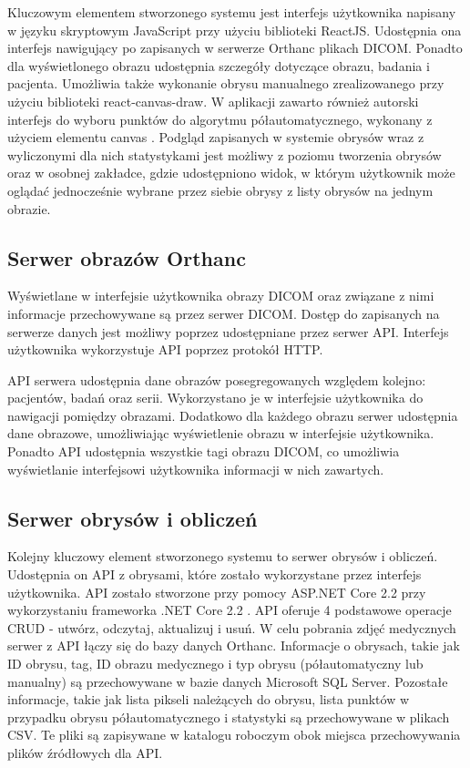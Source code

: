 \documentclass[a4paper,11pt,twoside,openright]{report}
\theoremstyle{definition}
\begin{document}
Kluczowym elementem stworzonego systemu jest interfejs użytkownika napisany w
języku skryptowym JavaScript przy użyciu biblioteki ReactJS. Udostępnia ona
interfejs nawigujący po zapisanych w serwerze Orthanc plikach DICOM. Ponadto dla
wyświetlonego obrazu udostępnia szczegóły dotyczące obrazu, badania i pacjenta.
Umożliwia także wykonanie obrysu manualnego zrealizowanego przy użyciu biblioteki
react-canvas-draw. W aplikacji zawarto również autorski interfejs do wyboru punktów
do algorytmu półautomatycznego, wykonany z użyciem elementu canvas \cite{Canvas}.
Podgląd zapisanych w systemie obrysów wraz z wyliczonymi dla nich statystykami
jest możliwy z poziomu tworzenia obrysów oraz w osobnej zakładce, gdzie udostępniono
widok, w którym użytkownik może oglądać jednocześnie wybrane przez siebie obrysy
z listy obrysów na jednym obrazie.

\subsection {Serwer obrazów Orthanc}

Wyświetlane w interfejsie użytkownika obrazy DICOM oraz związane z nimi informacje
przechowywane są przez serwer DICOM. Dostęp do zapisanych na serwerze danych jest
możliwy poprzez udostępniane przez serwer API. Interfejs użytkownika wykorzystuje
API poprzez protokół HTTP.

API serwera udostępnia dane obrazów posegregowanych względem kolejno: pacjentów,
badań oraz serii. Wykorzystano je w interfejsie użytkownika do nawigacji pomiędzy
obrazami. Dodatkowo dla każdego obrazu serwer udostępnia dane obrazowe, umożliwiając
wyświetlenie obrazu w interfejsie użytkownika. Ponadto API udostępnia wszystkie
tagi obrazu DICOM, co umożliwia wyświetlanie interfejsowi użytkownika informacji
w nich zawartych.

\subsection {Serwer obrysów i obliczeń}
Kolejny kluczowy element stworzonego systemu to serwer obrysów i obliczeń. Udostępnia
on API z obrysami, które zostało wykorzystane przez interfejs użytkownika. API zostało
stworzone przy pomocy ASP.NET Core 2.2 \cite{ASPNET} przy wykorzystaniu frameworka
.NET Core 2.2 \cite{Charakterystyka dotnet}. API oferuje 4 podstawowe operacje CRUD
- utwórz, odczytaj, aktualizuj i usuń. W celu pobrania zdjęć medycznych serwer z API
łączy się do bazy danych Orthanc. Informacje o obrysach, takie jak ID obrysu, tag,
ID obrazu medycznego i typ obrysu (półautomatyczny lub manualny) są przechowywane
w bazie danych Microsoft SQL Server. Pozostałe informacje, takie jak lista pikseli
należących do obrysu, lista punktów w przypadku obrysu półautomatycznego i statystyki
są przechowywane w plikach CSV. Te pliki są zapisywane w katalogu roboczym obok
miejsca przechowywania plików źródłowych dla API.
\end{document}
